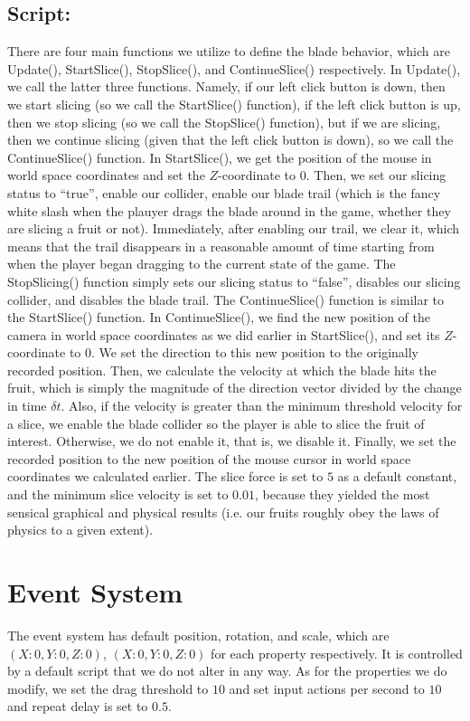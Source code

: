 \subsection{Script:}
There are four main functions we utilize to define the blade behavior, which are Update(), StartSlice(), StopSlice(), and ContinueSlice() respectively. In Update(), we call the latter three 
functions. Namely, if our left click button is down, then we start slicing (so we call the StartSlice() function), if the left click button is up, then we stop slicing (so we call the 
StopSlice() function), but if we are slicing, then we continue slicing (given that the left click button is down), so we call the ContinueSlice() function. In StartSlice(), we get the 
position of the mouse in world space coordinates and set the $Z$-coordinate to $0$. Then, we set our slicing status to ``true'', enable our collider, enable our blade trail (which is the fancy 
white slash when the plauyer drags the blade around in the game, whether they are slicing a fruit or not). Immediately, after enabling our trail, we clear it, which means that the trail disappears 
in a reasonable amount of time starting from when the player began dragging to the current state of the game. The StopSlicing() function simply sets our slicing status to ``false'', disables our 
slicing collider, and disables the blade trail. The ContinueSlice() function is similar to the StartSlice() function. In ContinueSlice(), we find the new position of the camera in world space 
coordinates as we did earlier in StartSlice(), and set its $Z$-coordinate to $0$. We set the direction to this new position to the originally recorded position. Then, we calculate the velocity 
at which the blade hits the fruit, which is simply the magnitude of the direction vector divided by the change in time $\delta t$. Also, if the velocity is greater than the minimum threshold 
velocity for a slice, we enable the blade collider so the player is able to slice the fruit of interest. Otherwise, we do not enable it, that is, we disable it. Finally, we set the recorded position 
to the new position of the mouse cursor in world space coordinates we calculated earlier. The slice force is set to $5$ as a default constant, and the minimum slice velocity is set to $0.01$, 
because they yielded the most sensical graphical and physical results (i.e. our fruits roughly obey the laws of physics to a given extent).

\section{Event System}
The event system has default position, rotation, and scale, which are $(X: 0, Y: 0, Z: 0)$, $(X: 0, Y: 0, Z: 0)$ for each property respectively. It is controlled by a default script that we do not 
alter in any way. As for the properties we do modify, we set the drag threshold to $10$ and set input actions per second to $10$ and repeat delay is set to $0.5$.

